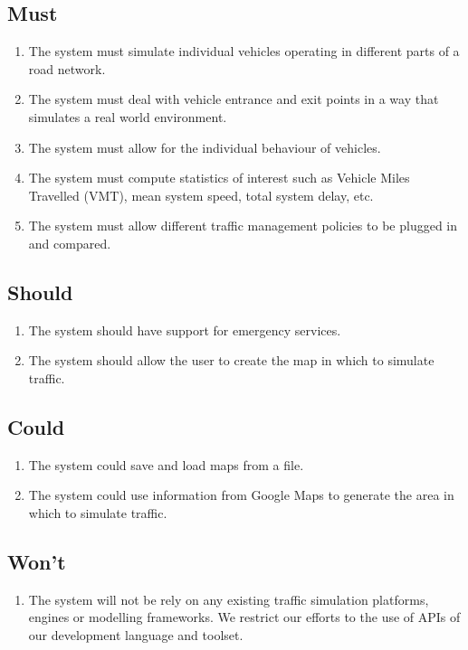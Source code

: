 \documentclass[11pt,a4paper]{article}
\begin{document}
\subsection{Must}
\label{section:must}
\begin{enumerate}
  \item The system must simulate individual vehicles operating in different parts of a road network.
  \item The system must deal with vehicle entrance and exit points in a way that simulates a real world environment.
  \item The system must allow for the individual behaviour of vehicles.
  \item The system must compute statistics of interest such as Vehicle Miles Travelled (VMT), mean system speed, total system delay, etc. 
  \item The system must allow different traffic management policies to be plugged in and compared.
\end{enumerate}

\subsection{Should}
\begin{enumerate}
  \item The system should have support for emergency services.
  \item The system should allow the user to create the map in which to simulate traffic.
\end{enumerate}

\subsection{Could}
\begin{enumerate}
  \item The system could save and load maps from a file.
  \item The system could use information from Google Maps to generate the area in which to simulate traffic.
\end{enumerate}

\subsection{Won't}
\begin{enumerate}
  \item The system will not be rely on any existing traffic simulation platforms, engines or modelling frameworks.  We restrict our efforts to the use of APIs of our development language and toolset.
\end{enumerate}
\end{document}
